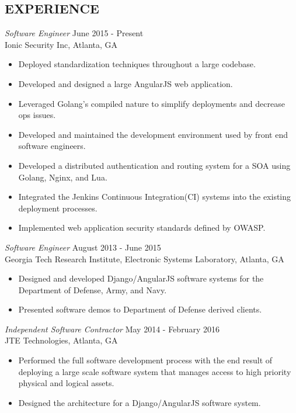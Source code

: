 \documentclass[margin, 10pt]{res} %
\begin{document}
\begin{resume}
 
\section{EXPERIENCE}

{\sl Software Engineer} \hfill June 2015 - Present \\
Ionic Security Inc, Atlanta, GA
\begin{itemize}
\item Deployed standardization techniques throughout a large codebase.
\item Developed and designed a large AngularJS web application.
\item Leveraged Golang's compiled nature to simplify deployments and decrease ops issues.
\item Developed and maintained the development environment used by front end software engineers.
\item Developed a distributed authentication and routing system for a SOA using Golang, Nginx, and Lua.
\item Integrated the Jenkins Continuous Integration(CI) systems into the existing deployment processes.
\item Implemented web application security standards defined by OWASP.
\end{itemize} 

{\sl Software Engineer} \hfill August 2013 - June 2015 \\
Georgia Tech Research Institute, Electronic Systems Laboratory, Atlanta, GA 
\begin{itemize} \itemsep -2pt %
\item Designed and developed Django/AngularJS software systems for the Department of Defense, Army, and Navy.
\item Presented software demos to Department of Defense derived clients.
\end{itemize}
 
{\sl Independent Software Contractor} \hfill May 2014 - February 2016\\
JTE Technologies, Atlanta, GA
\begin{itemize} 
\item Performed the full software development process with the end result of deploying a large scale software system that manages access to high priority physical and logical assets.
\item Designed the architecture for a Django/AngularJS software system.
\end{itemize} 



\end{resume}
\end{document}
